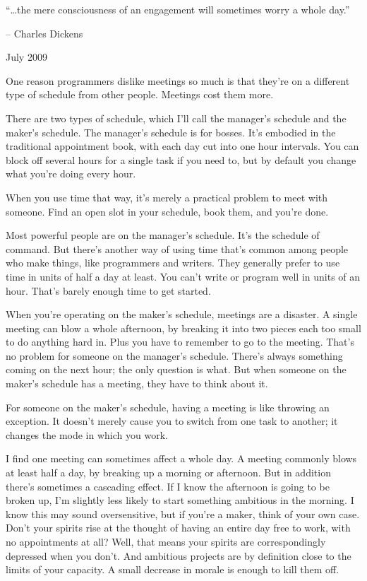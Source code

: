 ``\ldots the mere consciousness of an engagement will sometimes worry a
whole day.''

-- Charles Dickens

July 2009

One reason programmers dislike meetings so much is that they're on a
different type of schedule from other people. Meetings cost them more.

There are two types of schedule, which I'll call the manager's schedule
and the maker's schedule. The manager's schedule is for bosses. It's
embodied in the traditional appointment book, with each day cut into one
hour intervals. You can block off several hours for a single task if you
need to, but by default you change what you're doing every hour.

When you use time that way, it's merely a practical problem to meet with
someone. Find an open slot in your schedule, book them, and you're done.

Most powerful people are on the manager's schedule. It's the schedule of
command. But there's another way of using time that's common among
people who make things, like programmers and writers. They generally
prefer to use time in units of half a day at least. You can't write or
program well in units of an hour. That's barely enough time to get
started.

When you're operating on the maker's schedule, meetings are a disaster.
A single meeting can blow a whole afternoon, by breaking it into two
pieces each too small to do anything hard in. Plus you have to remember
to go to the meeting. That's no problem for someone on the manager's
schedule. There's always something coming on the next hour; the only
question is what. But when someone on the maker's schedule has a
meeting, they have to think about it.

For someone on the maker's schedule, having a meeting is like throwing
an exception. It doesn't merely cause you to switch from one task to
another; it changes the mode in which you work.

I find one meeting can sometimes affect a whole day. A meeting commonly
blows at least half a day, by breaking up a morning or afternoon. But in
addition there's sometimes a cascading effect. If I know the afternoon
is going to be broken up, I'm slightly less likely to start something
ambitious in the morning. I know this may sound oversensitive, but if
you're a maker, think of your own case. Don't your spirits rise at the
thought of having an entire day free to work, with no appointments at
all? Well, that means your spirits are correspondingly depressed when
you don't. And ambitious projects are by definition close to the limits
of your capacity. A small decrease in morale is enough to kill them off.

